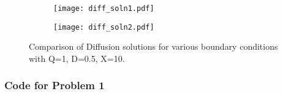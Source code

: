 \documentclass[12pt]{article}
\begin{document}
    \begin{figure}[h!]
        \centering
        \begin{subfigure}{0.495\textwidth}
            \centering 
            \texttt{[image: diff\_soln1.pdf]}
        \end{subfigure}
        \begin{subfigure}{0.495\textwidth}
            \centering 
            \texttt{[image: diff\_soln2.pdf]}
        \end{subfigure}
        \caption{Comparison of Diffusion solutions for various boundary conditions
        with Q=1, D=0.5, X=10.}
    \end{figure}
\clearpage
\subsubsection*{Code for Problem 1}


\end{document}
